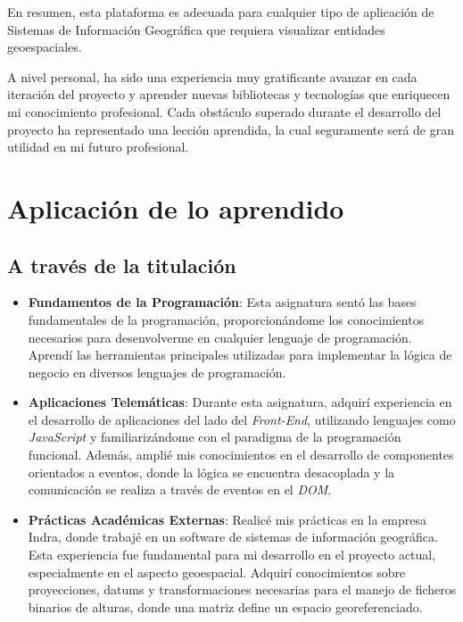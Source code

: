 \documentclass[a4paper, 11pt]{book}
\begin{document}
En resumen, esta plataforma es adecuada para cualquier tipo de aplicación de Sistemas de Información Geográfica que requiera visualizar entidades geoespaciales.

A nivel personal, ha sido una experiencia muy gratificante avanzar en cada iteración del proyecto y aprender nuevas bibliotecas y tecnologías que enriquecen mi conocimiento profesional. Cada obstáculo superado durante el desarrollo del proyecto ha representado una lección aprendida, la cual seguramente será de gran utilidad en mi futuro profesional.
\section{Aplicación de lo aprendido}
\label{sec:aplicacion}
\subsection{A través de la titulación}
\begin{itemize}
	\item \textbf{Fundamentos de la Programación}: Esta asignatura sentó las bases fundamentales de la programación, proporcionándome los conocimientos necesarios para desenvolverme en cualquier lenguaje de programación. Aprendí las herramientas principales utilizadas para implementar la lógica de negocio en diversos lenguajes de programación.
	\item \textbf{Aplicaciones Telemáticas}: Durante esta asignatura, adquirí experiencia en el desarrollo de aplicaciones del lado del \emph{Front-End}, utilizando lenguajes como \emph{JavaScript} y familiarizándome con el paradigma de la programación funcional. Además, amplié mis conocimientos en el desarrollo de componentes orientados a eventos, donde la lógica se encuentra desacoplada y la comunicación se realiza a través de eventos en el \emph{\gls{DOM}}.
	\item \textbf{Prácticas Académicas Externas}: Realicé mis prácticas en la empresa Indra, donde trabajé en un software de sistemas de información geográfica. Esta experiencia fue fundamental para mi desarrollo en el proyecto actual, especialmente en el aspecto \gls{geoespacial}. Adquirí conocimientos sobre proyecciones, datums y transformaciones necesarias para el manejo de ficheros binarios de alturas, donde una matriz define un espacio georeferenciado.
\end{itemize}
\end{document}
